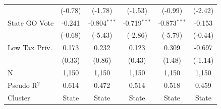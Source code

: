 \begin{tabular*}{\textwidth}{@{\extracolsep{\fill}}lccccc}
                        & (-0.78)      & (-1.78)       & (-1.53)       & (-0.99)       & (-2.42)\\   
   State GO Vote        & -0.241        & -0.804$^{***}$ & -0.719$^{***}$ & -0.873$^{***}$ & -0.153\\   
                        & (-0.68)      & (-5.43)       & (-2.86)       & (-5.79)       & (-0.44)\\   
   Low Tax Priv.        & 0.173         & 0.232          & 0.123          & 0.309          & -0.697\\   
                        & (0.33)       & (0.86)        & (0.43)        & (1.48)        & (-1.14)\\   
   \hline
   N         & 1,150         & 1,150          & 1,150          & 1,150          & 1,150\\  
   Pseudo R$^2$         & 0.614         & 0.472          & 0.514          & 0.518          & 0.459\\  
   Cluster              & State & State & State & State & State\\  
   \bottomrule
\end{tabular*}
\par\endgroup
